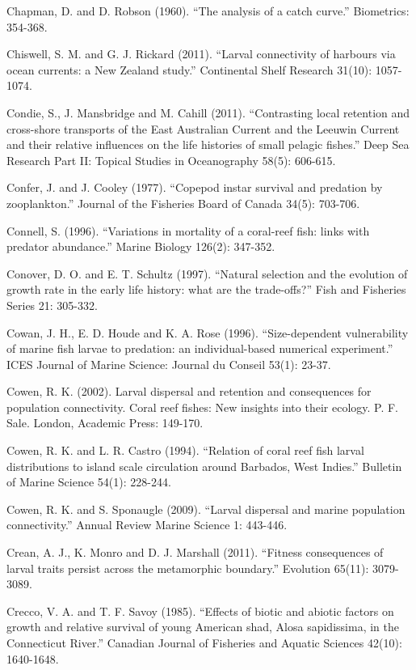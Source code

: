 \documentclass[]{book}
\begin{document}
Chapman, D. and D. Robson (1960). ``The analysis of a catch curve.''
Biometrics: 354-368.

Chiswell, S. M. and G. J. Rickard (2011). ``Larval connectivity of
harbours via ocean currents: a New Zealand study.'' Continental Shelf
Research 31(10): 1057-1074.

Condie, S., J. Mansbridge and M. Cahill (2011). ``Contrasting local
retention and cross-shore transports of the East Australian Current and
the Leeuwin Current and their relative influences on the life histories
of small pelagic fishes.'' Deep Sea Research Part II: Topical Studies in
Oceanography 58(5): 606-615.

Confer, J. and J. Cooley (1977). ``Copepod instar survival and predation
by zooplankton.'' Journal of the Fisheries Board of Canada 34(5):
703-706.

Connell, S. (1996). ``Variations in mortality of a coral-reef fish:
links with predator abundance.'' Marine Biology 126(2): 347-352.

Conover, D. O. and E. T. Schultz (1997). ``Natural selection and the
evolution of growth rate in the early life history: what are the
trade-offs?'' Fish and Fisheries Series 21: 305-332.

Cowan, J. H., E. D. Houde and K. A. Rose (1996). ``Size-dependent
vulnerability of marine fish larvae to predation: an individual-based
numerical experiment.'' ICES Journal of Marine Science: Journal du
Conseil 53(1): 23-37.

Cowen, R. K. (2002). Larval dispersal and retention and consequences for
population connectivity. Coral reef fishes: New insights into their
ecology. P. F. Sale. London, Academic Press: 149-170.

Cowen, R. K. and L. R. Castro (1994). ``Relation of coral reef fish
larval distributions to island scale circulation around Barbados, West
Indies.'' Bulletin of Marine Science 54(1): 228-244.

Cowen, R. K. and S. Sponaugle (2009). ``Larval dispersal and marine
population connectivity.'' Annual Review Marine Science 1: 443-446.

Crean, A. J., K. Monro and D. J. Marshall (2011). ``Fitness consequences
of larval traits persist across the metamorphic boundary.'' Evolution
65(11): 3079-3089.

Crecco, V. A. and T. F. Savoy (1985). ``Effects of biotic and abiotic
factors on growth and relative survival of young American shad, Alosa
sapidissima, in the Connecticut River.'' Canadian Journal of Fisheries
and Aquatic Sciences 42(10): 1640-1648.
\end{document}

